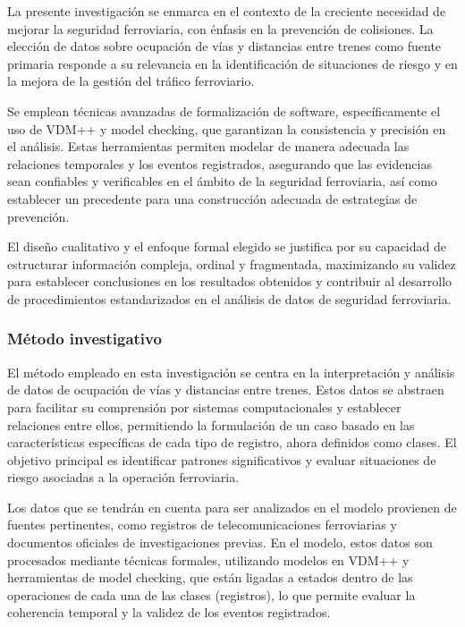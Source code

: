 \documentclass[journal]{IEEEtran}
\begin{document}
La presente investigación se enmarca en el contexto de la creciente necesidad de mejorar la seguridad ferroviaria, con énfasis en la prevención de colisiones. La elección de datos sobre ocupación de vías y distancias entre trenes como fuente primaria responde a su relevancia en la identificación de situaciones de riesgo y en la mejora de la gestión del tráfico ferroviario.  

Se emplean técnicas avanzadas de formalización de software, específicamente el uso de VDM++ y model checking, que garantizan la consistencia y precisión en el análisis. Estas herramientas permiten modelar de manera adecuada las relaciones temporales y los eventos registrados, asegurando que las evidencias sean confiables y verificables en el ámbito de la seguridad ferroviaria, así como establecer un precedente para una construcción adecuada de estrategias de prevención.  

El diseño cualitativo y el enfoque formal elegido se justifica por su capacidad de estructurar información compleja, ordinal y fragmentada, maximizando su validez para establecer conclusiones en los resultados obtenidos y contribuir al desarrollo de procedimientos estandarizados en el análisis de datos de seguridad ferroviaria.  

\subsubsection*{Método investigativo}  
El método empleado en esta investigación se centra en la interpretación y análisis de datos de ocupación de vías y distancias entre trenes. Estos datos se abstraen para facilitar su comprensión por sistemas computacionales y establecer relaciones entre ellos, permitiendo la formulación de un caso basado en las características específicas de cada tipo de registro, ahora definidos como clases. El objetivo principal es identificar patrones significativos y evaluar situaciones de riesgo asociadas a la operación ferroviaria.  

Los datos que se tendrán en cuenta para ser analizados en el modelo provienen de fuentes pertinentes, como registros de telecomunicaciones ferroviarias y documentos oficiales de investigaciones previas. En el modelo, estos datos son procesados mediante técnicas formales, utilizando modelos en VDM++ y herramientas de model checking, que están ligadas a estados dentro de las operaciones de cada una de las clases (registros), lo que permite evaluar la coherencia temporal y la validez de los eventos registrados.  
\end{document}
